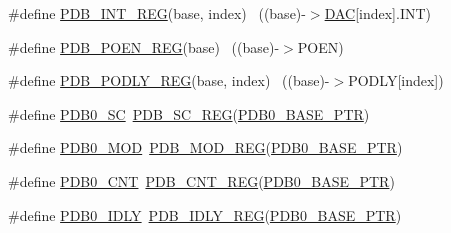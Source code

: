 \begin{DoxyCompactItemize}
\item 
\#define \hyperlink{group___p_d_b___register___accessor___macros_ga7d45f442e722e2b7ba35b2bff6fafac9}{P\+D\+B\+\_\+\+I\+N\+T\+\_\+\+R\+EG}(base,  index)                                ~((base)-\/$>$\hyperlink{group___peripheral__declaration_ga4aa2a4ab86ce00c23035e5cee2e7fc7e}{D\+AC}\mbox{[}index\mbox{]}.I\+NT)
\item 
\#define \hyperlink{group___p_d_b___register___accessor___macros_gab3f4129b6c1d82cf04a4e0156ab6595a}{P\+D\+B\+\_\+\+P\+O\+E\+N\+\_\+\+R\+EG}(base)                                          ~((base)-\/$>$P\+O\+EN)
\item 
\#define \hyperlink{group___p_d_b___register___accessor___macros_ga1dc2bd036463575232f4638acafa3efb}{P\+D\+B\+\_\+\+P\+O\+D\+L\+Y\+\_\+\+R\+EG}(base,  index)                            ~((base)-\/$>$P\+O\+D\+LY\mbox{[}index\mbox{]})
\item 
\#define \hyperlink{group___p_d_b___register___accessor___macros_ga033ea8777ba5d2f3491be5723fc6eea5}{P\+D\+B0\+\_\+\+SC}~\hyperlink{group___p_d_b___register___accessor___macros_ga1591bd73f684fdc755e12eef3d570734}{P\+D\+B\+\_\+\+S\+C\+\_\+\+R\+EG}(\hyperlink{group___p_d_b___peripheral_ga8e197b7c43fd7a0bf1a38caa1918b7b5}{P\+D\+B0\+\_\+\+B\+A\+S\+E\+\_\+\+P\+TR})
\item 
\#define \hyperlink{group___p_d_b___register___accessor___macros_gacefe5da9a5646a5e2317c2c5c26ddb9a}{P\+D\+B0\+\_\+\+M\+OD}~\hyperlink{group___p_d_b___register___accessor___macros_ga8c8a28c2bc66773f6820aaa1badaffcc}{P\+D\+B\+\_\+\+M\+O\+D\+\_\+\+R\+EG}(\hyperlink{group___p_d_b___peripheral_ga8e197b7c43fd7a0bf1a38caa1918b7b5}{P\+D\+B0\+\_\+\+B\+A\+S\+E\+\_\+\+P\+TR})
\item 
\#define \hyperlink{group___p_d_b___register___accessor___macros_ga8a262bfe42630487eb721630439f6d9f}{P\+D\+B0\+\_\+\+C\+NT}~\hyperlink{group___p_d_b___register___accessor___macros_ga3bc07ddecbb4c1fe42bb5953e703cca0}{P\+D\+B\+\_\+\+C\+N\+T\+\_\+\+R\+EG}(\hyperlink{group___p_d_b___peripheral_ga8e197b7c43fd7a0bf1a38caa1918b7b5}{P\+D\+B0\+\_\+\+B\+A\+S\+E\+\_\+\+P\+TR})
\item 
\#define \hyperlink{group___p_d_b___register___accessor___macros_ga9f10b09be455b24a669a841584d80936}{P\+D\+B0\+\_\+\+I\+D\+LY}~\hyperlink{group___p_d_b___register___accessor___macros_ga117aa5730c78ef78a2c18f49cf9a7663}{P\+D\+B\+\_\+\+I\+D\+L\+Y\+\_\+\+R\+EG}(\hyperlink{group___p_d_b___peripheral_ga8e197b7c43fd7a0bf1a38caa1918b7b5}{P\+D\+B0\+\_\+\+B\+A\+S\+E\+\_\+\+P\+TR})
\item 

\end{DoxyCompactItemize}
